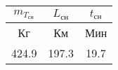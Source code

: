 \begin{tabular}{|c|c|c|}
\hline
$m_{T_{сн}}$ & $L_{сн}$ & $t_{сн}$ \\ 
\hline
Кг & Км & Мин \\ 
\hline
424.9 & 197.3 & 19.7 \\ 
\hline
\end{tabular}